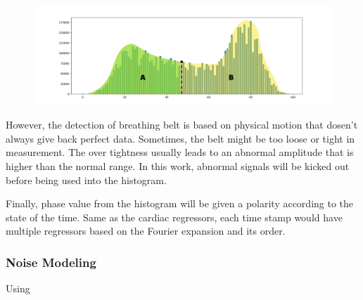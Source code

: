 \begin{figure}[htp]
    \centering
    \includegraphics[width=\columnwidth]{Figures/histogram.png}
    \caption{}
    \label{fig:hist}
\end{figure}

However, the detection of breathing belt is based on physical motion that dosen't always give back
perfect data. Sometimes, the belt might be too loose or tight in measurement. The over tightness usually leads
to an abnormal amplitude that is higher than the normal range. In this work, abnormal signals will be 
kicked out before being used into the histogram.

Finally, phase value from the histogram will be given a polarity according to the state of the time.
Same as the cardiac regressors, each time stamp would have multiple regressors based on the Fourier expansion and its order.


\subsubsection{Noise Modeling}
Using 

